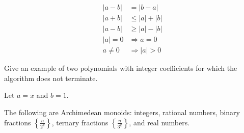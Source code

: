 \begin{lemma}
	\begin{align*}
		|a - b| &= |b - a|\\
		|a + b| &\leq |a| + |b|\\
		|a - b| &\geq |a| - |b|\\
		|a| = 0 &\Rightarrow a = 0\\
		a \neq 0 &\Rightarrow |a| > 0
	\end{align*}
\end{lemma}

\begin{exercise}
	Give an example of two polynomials with integer coefficients for which
	the algorithm does not terminate.
\end{exercise}

\begin{solution}
	Let $a = x$ and $b = 1$.
\end{solution}

\begin{lemma}
	The following are Archimedean monoids: integers, rational numbers, binary fractions
	$\left\{\frac{n}{2^k}\right\}$, ternary fractions $\left\{\frac{n}{3^k}\right\}$, and
	real numbers.
\end{lemma}
